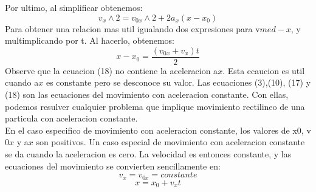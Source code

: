 \documentclass{article}
\begin{document}
Por ultimo, al simplificar obtenemos:
\begin{equation}
v_{x}\wedge{2}= v_{0x}\wedge{2} +2a_{x}(x-x_{0})
\end{equation}
Para obtener una relacion mas util igualando dos expresiones para v$med-x$, y multimplicando por t. Al hacerlo, obtenemos: 
\begin{equation}
x-x_{0} = \frac{(v_{0x}+v_{x})t}{2}
\end{equation}
Observe que la ecuacion (18) no contiene la aceleracion a$x$. Esta ecaucion es util cuando a$x$ es constante pero se desconoce su valor.
Las ecuaciones (3),(10), (17) y (18) son las ecuaciones del movimiento con aceleracion constante. Con ellas, podemos resulver cualquier problema que implique movimiento 
rectilineo de una particula con aceleracion constante.
\\En el caso especifico de movimiento con aceleracion constante, los valores de x$0$, v$0x$ y a$x$ son positivos. Un caso especial de movimiento con aceleracion constante 
se da cuando la aceleracion es cero.
La velocidad es entonces constante, y las ecuaciones del movimiento se convierten sencillamente en:
\begin{equation}
v_{x}= v_{0x}=constante
\end{equation}
\begin{equation}
x = x_{0} + v_{x}t
\end{equation}
\end{document}
